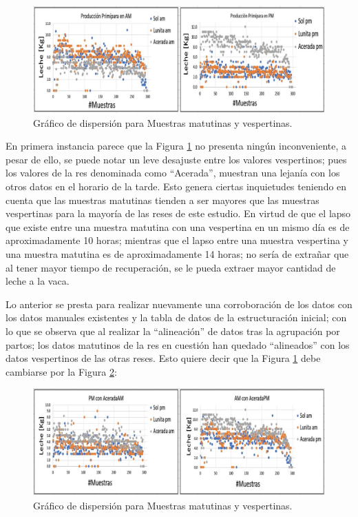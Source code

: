 \begin{figure}[H]
	 \begin{center}
	 \includegraphics[scale=0.575]{img/desfaseAMPM.jpg}
	 \end{center}
	 \caption{Gráfico de dispersión para Muestras matutinas y vespertinas. \label{desfaseAMPMpng}}
\end{figure}

En primera instancia parece que la Figura \ref{desfaseAMPMpng} no presenta ningún inconveniente, a pesar de ello, se puede notar un leve desajuste entre los valores vespertinos; pues los valores de la res denominada como ``Acerada'', muestran una lejanía con los otros datos en el horario de la tarde. Esto genera ciertas inquietudes teniendo en cuenta que las muestras matutinas tienden a ser mayores que las muestras vespertinas para la mayoría de las reses de este estudio. En virtud de que el lapso que existe entre una muestra matutina con una vespertina en un mismo día es de aproximadamente 10 horas; mientras que el lapso entre una muestra vespertina y una muestra matutina es de aproximadamente 14 horas; no sería de extrañar que al tener mayor tiempo de recuperación, se le pueda extraer mayor cantidad de leche a la vaca.

Lo anterior se presta para realizar nuevamente una corroboración de los datos con los datos manuales existentes y la tabla de datos de la estructuración inicial; con lo que se observa que al realizar la ``alineación'' de datos tras la agrupación por partos; los datos matutinos de la res en cuestión han quedado ``alineados'' con los datos vespertinos de las otras reses. Esto quiere decir que la Figura \ref{desfaseAMPMpng} debe cambiarse por la Figura \ref{AMPMsindesfasepng}:


\begin{figure}[H]
	 \begin{center}
	 \includegraphics[scale=0.5835]{img/AMPMsindesfase.jpg}
	 \end{center}
	 \caption{Gráfico de dispersión para Muestras matutinas y vespertinas. \label{AMPMsindesfasepng}}
\end{figure}


